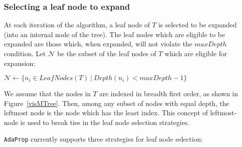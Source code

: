 \documentclass[a4paper,12pt]{article} %
\newcommand{\AdaProp}{\texttt{AdaProp}\xspace}
\newcommand{\mcl}[1]{\mathcal{#1}}
\begin{document}
\subsubsection{Selecting a leaf node to expand}
\label{secTreeBuild}

At each iteration of the algorithm, 
    a leaf node of $T$ is selected to be expanded 
    (into an internal node of the tree).
The leaf nodes which are eligible to be expanded
    are those which, when expanded, will not 
    violate the $maxDepth$ condition.
Let $\mcl{N}$ be the subset of the leaf nodes of $T$ 
    which are eligible for expansion:
\begin{algorithmic}
    \State $\mcl{N} \gets \{ n_i \in LeafNodes(T) ~\big|~ Depth(n_i) < maxDepth - 1 \} $
\end{algorithmic}
We assume that the nodes in $T$ are indexed in breadth first order, 
    as shown in Figure~\ref{visMTree}.
Then, among any subset of nodes with equal depth,
    the leftmost node is the node which has the least index.
This concept of leftmost-node is used to break ties in the 
    leaf node selection strategies.    
    
\AdaProp currently supports three strategies for leaf node selection:
\end{document}
